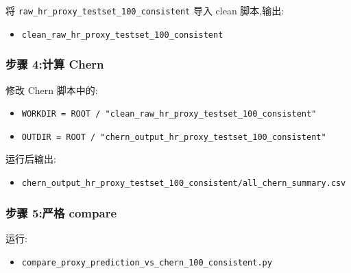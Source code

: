 \documentclass[lang=cn,scheme=chinese,color=blue,device=normal,toc=onecol,math=cm]{elegantbook}
\begin{document}
将 \texttt{raw\_\allowbreak{}hr\_\allowbreak{}proxy\_\allowbreak{}testset\_\allowbreak{}100\_\allowbreak{}consistent} 导入 clean 脚本,输出:\par


\begin{itemize}
\item \texttt{clean\_\allowbreak{}raw\_\allowbreak{}hr\_\allowbreak{}proxy\_\allowbreak{}testset\_\allowbreak{}100\_\allowbreak{}consistent}
\end{itemize}


\subsubsection{步骤 4:计算 Chern}


修改 Chern 脚本中的:\par


\begin{itemize}
\item \texttt{WORKDIR = ROOT /\allowbreak{} "clean\_\allowbreak{}raw\_\allowbreak{}hr\_\allowbreak{}proxy\_\allowbreak{}testset\_\allowbreak{}100\_\allowbreak{}consistent"}
\item \texttt{OUTDIR = ROOT /\allowbreak{} "chern\_\allowbreak{}output\_\allowbreak{}hr\_\allowbreak{}proxy\_\allowbreak{}testset\_\allowbreak{}100\_\allowbreak{}consistent"}
\end{itemize}


运行后输出:\par


\begin{itemize}
\item \texttt{chern\_\allowbreak{}output\_\allowbreak{}hr\_\allowbreak{}proxy\_\allowbreak{}testset\_\allowbreak{}100\_\allowbreak{}consistent/\allowbreak{}all\_\allowbreak{}chern\_\allowbreak{}summary.csv}
\end{itemize}


\subsubsection{步骤 5:严格 compare}


运行:\par


\begin{itemize}
\item \texttt{compare\_\allowbreak{}proxy\_\allowbreak{}prediction\_\allowbreak{}vs\_\allowbreak{}chern\_\allowbreak{}100\_\allowbreak{}consistent.py}
\end{itemize}
\end{document}
